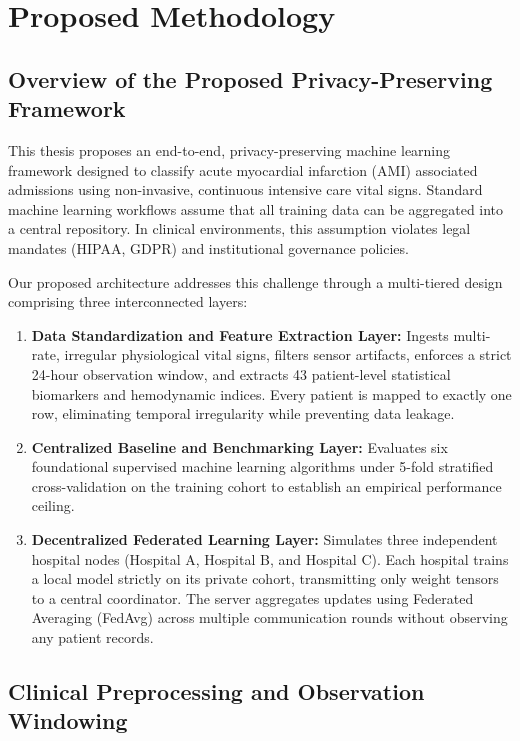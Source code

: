 \documentclass[12pt,a4paper,oneside]{report}
\begin{document}
\chapter{Proposed Methodology}
\label{ch:methodology}

\section{Overview of the Proposed Privacy-Preserving Framework}
\label{sec:method_overview}

This thesis proposes an end-to-end, privacy-preserving machine learning framework designed to classify acute myocardial infarction (AMI) associated admissions using non-invasive, continuous intensive care vital signs. Standard machine learning workflows assume that all training data can be aggregated into a central repository. In clinical environments, this assumption violates legal mandates (HIPAA, GDPR) and institutional governance policies. 

Our proposed architecture addresses this challenge through a multi-tiered design comprising three interconnected layers:
\begin{enumerate}
    \item \textbf{Data Standardization and Feature Extraction Layer:} Ingests multi-rate, irregular physiological vital signs, filters sensor artifacts, enforces a strict 24-hour observation window, and extracts 43 patient-level statistical biomarkers and hemodynamic indices. Every patient is mapped to exactly one row, eliminating temporal irregularity while preventing data leakage.
    \item \textbf{Centralized Baseline and Benchmarking Layer:} Evaluates six foundational supervised machine learning algorithms under 5-fold stratified cross-validation on the training cohort to establish an empirical performance ceiling.
    \item \textbf{Decentralized Federated Learning Layer:} Simulates three independent hospital nodes (Hospital A, Hospital B, and Hospital C). Each hospital trains a local model strictly on its private cohort, transmitting only weight tensors to a central coordinator. The server aggregates updates using Federated Averaging (FedAvg) across multiple communication rounds without observing any patient records.
\end{enumerate}

\section{Clinical Preprocessing and Observation Windowing}
\label{sec:preprocessing_windowing}
\end{document}
